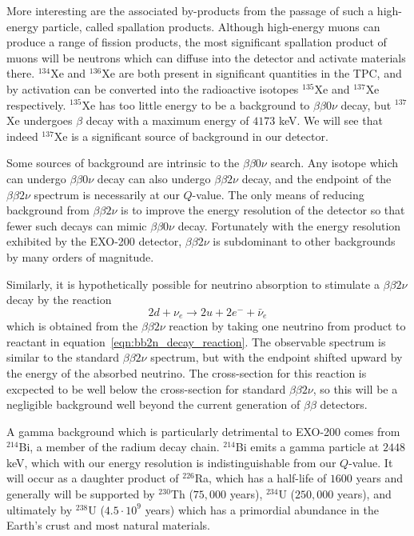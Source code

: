 More interesting are the associated by-products from the passage of such a high-energy particle, called spallation products.  Although high-energy muons can produce a range of fission products, the most significant spallation product of muons will be neutrons which can diffuse into the detector and activate materials there.  $^{134}$Xe and $^{136}$Xe are both present in significant quantities in the TPC, and by activation can be converted into the radioactive isotopes $^{135}$Xe and $^{137}$Xe respectively.  $^{135}$Xe has too little energy to be a background to $\beta\beta 0\nu$ decay, but $^{137}$Xe undergoes $\beta$ decay with a maximum energy of $4173$ keV.  We will see that indeed $^{137}$Xe is a significant source of background in our detector.~\cite{NewEXObb0nPaper_2014}~\cite{NeutronCaptureGammas}

Some sources of background are intrinsic to the $\beta\beta 0\nu$ search.  Any isotope which can undergo $\beta\beta 0\nu$ decay can also undergo $\beta\beta 2\nu$ decay, and the endpoint of the $\beta\beta 2\nu$ spectrum is necessarily at our $Q$-value.  The only means of reducing background from $\beta\beta 2\nu$ is to improve the energy resolution of the detector so that fewer such decays can mimic $\beta\beta 0\nu$ decay.  Fortunately with the energy resolution exhibited by the EXO-200 detector, $\beta\beta 2\nu$ is subdominant to other backgrounds by many orders of magnitude.~\cite{NewEXObb0nPaper_2014}

Similarly, it is hypothetically possible for neutrino absorption to stimulate a $\beta\beta 2\nu$ decay by the reaction
\begin{equation}
2d + \nu_e \rightarrow 2u + 2e^- + \bar{\nu}_e
\end{equation}
which is obtained from the $\beta\beta 2\nu$ reaction by taking one neutrino from product to reactant in equation~\ref{eqn:bb2n_decay_reaction}.  The observable spectrum is similar to the standard $\beta\beta 2\nu$ spectrum, but with the endpoint shifted upward by the energy of the absorbed neutrino.  The cross-section for this reaction is excpected to be well below the cross-section for standard $\beta\beta 2\nu$, so this will be a negligible background well beyond the current generation of $\beta\beta$ detectors.

A gamma background which is particularly detrimental to EXO-200 comes from $^{214}$Bi, a member of the radium decay chain.  $^{214}$Bi emits a gamma particle at $2448$ keV, which with our energy resolution is indistinguishable from our $Q$-value.  It will occur as a daughter product of $^{226}$Ra, which has a half-life of $1600$ years and generally will be supported by $^{230}$Th ($75,000$ years), $^{234}$U ($250,000$ years), and ultimately by $^{238}$U ($4.5 \cdot 10^9$ years) which has a primordial abundance in the Earth's crust and most natural materials.~\cite{ENSDF}

